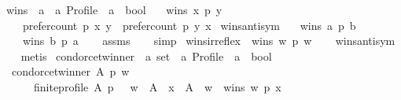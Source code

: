 \begin{isabellebody}
\ wins\ {\isacharcolon}{\kern0pt}{\isacharcolon}{\kern0pt}\ {\isachardoublequoteopen}{\isacharprime}{\kern0pt}a\ {\isasymRightarrow}\ {\isacharprime}{\kern0pt}a\ Profile\ {\isasymRightarrow}\ {\isacharprime}{\kern0pt}a\ {\isasymRightarrow}\ bool{\isachardoublequoteclose}\ \isanewline
\ \ {\isachardoublequoteopen}wins\ x\ p\ y\ {\isacharequal}{\kern0pt}\isanewline
\ \ \ \ {\isacharparenleft}{\kern0pt}prefer{\isacharunderscore}{\kern0pt}count\ p\ x\ y\ {\isachargreater}{\kern0pt}\ prefer{\isacharunderscore}{\kern0pt}count\ p\ y\ x{\isacharparenright}{\kern0pt}{\isachardoublequoteclose}\isanewline
\isanewline
\isanewline
{}\isamarkupfalse%
\ wins{\isacharunderscore}{\kern0pt}antisym{\isacharcolon}{\kern0pt}\isanewline
\ \ \ {\isachardoublequoteopen}wins\ a\ p\ b{\isachardoublequoteclose}\isanewline
\ \ \ {\isachardoublequoteopen}{\isasymnot}\ wins\ b\ p\ a{\isachardoublequoteclose}\isanewline
%
\isadelimproof
\ \ %
\endisadelimproof
%
\isatagproof
{}\isamarkupfalse%
\ assms\isanewline
\ \ \isamarkupfalse%
\ simp%
\endisatagproof
{\isafoldproof}%
%
\isadelimproof
\isanewline
%
\endisadelimproof
\isanewline
{}\isamarkupfalse%
\ wins{\isacharunderscore}{\kern0pt}irreflex{\isacharcolon}{\kern0pt}\ {\isachardoublequoteopen}{\isasymnot}\ wins\ w\ p\ w{\isachardoublequoteclose}\isanewline
%
\isadelimproof
\ \ %
\endisadelimproof
%
\isatagproof
{}\isamarkupfalse%
\ wins{\isacharunderscore}{\kern0pt}antisym\isanewline
\ \ \isamarkupfalse%
\ metis%
\endisatagproof
{\isafoldproof}%
%
\isadelimproof
%
\endisadelimproof
%
\isadelimdocument
%
\endisadelimdocument
%
\isatagdocument
%
\isamarkuptrue%
%
\endisatagdocument
{\isafolddocument}%
%
\isadelimdocument
%
\endisadelimdocument
{}\isamarkupfalse%
\ condorcet{\isacharunderscore}{\kern0pt}winner\ {\isacharcolon}{\kern0pt}{\isacharcolon}{\kern0pt}\ {\isachardoublequoteopen}{\isacharprime}{\kern0pt}a\ set\ {\isasymRightarrow}\ {\isacharprime}{\kern0pt}a\ Profile\ {\isasymRightarrow}\ {\isacharprime}{\kern0pt}a\ {\isasymRightarrow}\ bool{\isachardoublequoteclose}\ \isanewline
\ \ {\isachardoublequoteopen}condorcet{\isacharunderscore}{\kern0pt}winner\ A\ p\ w\ {\isacharequal}{\kern0pt}\isanewline
\ \ \ \ \ \ {\isacharparenleft}{\kern0pt}finite{\isacharunderscore}{\kern0pt}profile\ A\ p\ {\isasymand}\ \ w\ {\isasymin}\ A\ {\isasymand}\ {\isacharparenleft}{\kern0pt}{\isasymforall}x\ {\isasymin}\ A\ {\isacharminus}{\kern0pt}\ {\isacharbraceleft}{\kern0pt}w{\isacharbraceright}{\kern0pt}\ {\isachardot}{\kern0pt}\ wins\ w\ p\ x{\isacharparenright}{\kern0pt}{\isacharparenright}{\kern0pt}{\isachardoublequoteclose}\isanewline

\end{isabellebody}
